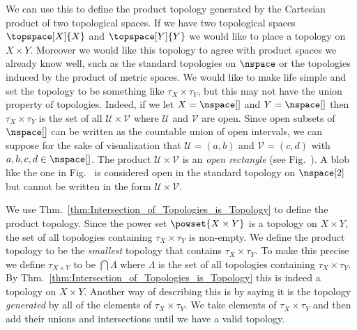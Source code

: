 \documentclass{book}                                                           %
\begin{document}
                We can use this to define the product topology generated by the
                Cartesian product of two topological spaces. If we have two
                topological spaces $\topspace[X]{X}$ and $\topspace[Y]{Y}$ we
                would like to place a topology on $X\times{Y}$. Moreover we
                would like this topology to agree with product spaces we already
                know well, such as the standard topologies on $\nspace$ or the
                topologies induced by the product of metric spaces. We would
                like to make life simple and set the topology to be something
                like $\tau_{X}\times\tau_{Y}$, but this may not have the union
                property of topologies. Indeed, if we let $X=\nspace[]$ and
                $Y=\nspace[]$ then $\tau_{X}\times\tau_{Y}$ is the set of all
                $\mathcal{U}\times\mathcal{V}$ where $\mathcal{U}$ and
                $\mathcal{V}$ are open. Since open subsets of $\nspace[]$ can be
                written as the countable union of open intervals, we can suppose
                for the sake of visualization that $\mathcal{U}=(a,b)$ and
                $\mathcal{V}=(c,d)$ with $a,b,c,d\in\nspace[]$. The product
                $\mathcal{U}\times\mathcal{V}$ is an \textit{open rectangle}
                (see Fig.~). A blob like the
                one in Fig.~ is considered
                open in the standard topology on $\nspace[2]$ but cannot be
                written in the form $\mathcal{U}\times\mathcal{V}$.
                \par\hfill\par
                \begin{minipage}[c]{0.50\textwidth}
                    We use
                    Thm.~\ref{thm:Intersection_of_Topologies_is_Topology} to
                    define the product topology. Since the power set
                    $\powset{X\times{Y}}$ is a topology on $X\times{Y}$, the set
                    of all topologies containing $\tau_{X}\times\tau_{Y}$ is
                    non-empty. We define the product topology to be the
                    \textit{smallest} topology that contains
                    $\tau_{X}\times\tau_{Y}$. To make this precise we define
                    $\tau_{X\times{Y}}$ to be $\bigcap\Lambda$ where $\Lambda$
                    is the set of all topologies containing
                    $\tau_{X}\times\tau_{Y}$. By
                    Thm.~\ref{thm:Intersection_of_Topologies_is_Topology} this
                    is indeed a topology on $X\times{Y}$.%
                    Another way of describing this is by saying it is the
                    topology \textit{generated} by all of the elements of
                    $\tau_{X}\times\tau_{Y}$. We take elements of
                    $\tau_{X}\times\tau_{Y}$ and then add their unions and
                    intersections until we have a valid topology.
                \end{minipage}
\end{document}

